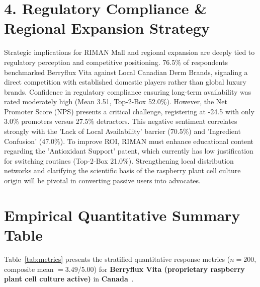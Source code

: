 \documentclass[10pt,twocolumn,a4paper]{article}
\begin{document}
\section{4. Regulatory Compliance \& Regional Expansion Strategy}
Strategic implications for RIMAN Mall and regional expansion are deeply tied to regulatory perception and competitive positioning. 76.5\% of respondents benchmarked Berryflux Vita against Local Canadian Derm Brands, signaling a direct competition with established domestic players rather than global luxury brands. Confidence in regulatory compliance ensuring long-term availability was rated moderately high (Mean 3.51, Top-2-Box 52.0\%). However, the Net Promoter Score (NPS) presents a critical challenge, registering at -24.5 with only 3.0\% promoters versus 27.5\% detractors. This negative sentiment correlates strongly with the 'Lack of Local Availability' barrier (70.5\%) and 'Ingredient Confusion' (47.0\%). To improve ROI, RIMAN must enhance educational content regarding the 'Antioxidant Support' patent, which currently has low justification for switching routines (Top-2-Box 21.0\%). Strengthening local distribution networks and clarifying the scientific basis of the raspberry plant cell culture origin will be pivotal in converting passive users into advocates.


\section{Empirical Quantitative Summary Table}
Table~\ref{tab:metrics} presents the stratified quantitative response metrics ($n = 200$, composite mean $= 3.49/5.00$) for \textbf{Berryflux Vita (proprietary raspberry plant cell culture active)} in \textbf{Canada}~\cite{ref_kaggle_doi,ref_hf_doi}.
\end{document}
